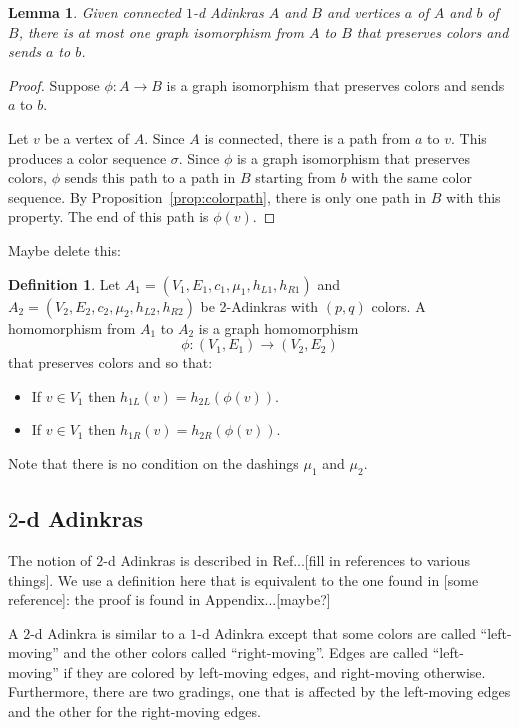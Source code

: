 \documentclass[12pt,twoside,singlespace]{article}
\numberwithin{equation}{section}
\newtheorem{lem}[equation]{Lemma}
\theoremstyle{definition}
\newtheorem{definition}[equation]{Definition}
\begin{document}
\begin{lem}
\label{lem:uniqueiso}
Given connected $1$-d Adinkras $A$ and $B$ and vertices $a$ of $A$ and $b$ of $B$, there is at most one graph isomorphism from $A$ to $B$ that preserves colors and sends $a$ to $b$.
\end{lem}
\begin{proof}
Suppose $\phi:A\to B$ is a graph isomorphism that preserves colors and sends $a$ to $b$.

Let $v$ be a vertex of $A$. Since $A$ is connected, there is a path from $a$ to $v$.  This produces a color sequence $\sigma$.  Since $\phi$ is a graph isomorphism that preserves colors, $\phi$ sends this path to a path in $B$ starting from $b$ with the same color sequence.  By Proposition~\ref{prop:colorpath}, there is only one path in $B$ with this property.  The end of this path is $\phi(v)$.
\end{proof}


Maybe delete this:


\begin{definition}
Let 
$A_1=(V_1,E_1,c_1,\mu_1,h_{L1},h_{R1})$
and
$A_2=(V_2,E_2,c_2,\mu_2,h_{L2},h_{R2})$
be 2-Adinkras with $(p,q)$ colors.  A homomorphism from $A_1$ to $A_2$ is a graph homomorphism
\[\phi:(V_1,E_1)\to (V_2,E_2)\]
that preserves colors and so that:
\begin{itemize}
\item If $v\in V_1$ then $h_{1L}(v)=h_{2L}(\phi(v))$.
\item If $v\in V_1$ then $h_{1R}(v)=h_{2R}(\phi(v))$.
\end{itemize}
Note that there is no condition on the dashings $\mu_1$ and $\mu_2$.
\end{definition}




\subsection{$2$-d Adinkras}
The notion of $2$-d Adinkras is described in Ref...[fill in references to various things].  We use a definition here that is equivalent to the one found in [some reference]: the proof is found in Appendix...[maybe?]

A $2$-d Adinkra is similar to a $1$-d Adinkra except that some colors are called ``left-moving'' and the other colors called ``right-moving''.  Edges are called ``left-moving'' if they are colored by left-moving edges, and right-moving otherwise.  Furthermore, there are two gradings, one that is affected by the left-moving edges and the other for the right-moving edges.
\end{document}
